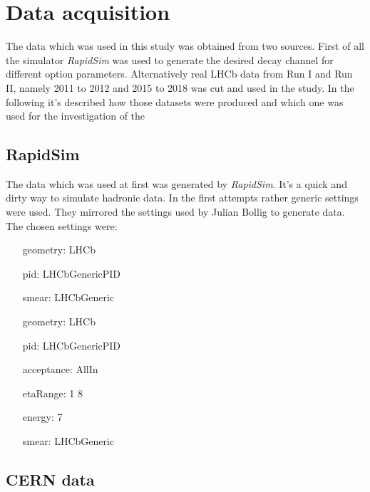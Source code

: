 \section{Data acquisition}
\noindent
The data which was used in this study was obtained from two sources. First of all the simulator \textit{RapidSim} was used to generate the desired decay channel for different option parameters. Alternatively real LHCb data from Run I and Run II, namely 2011 to 2012 and 2015 to 2018 was cut and used in the study. In the following it's described how those datasets were produced and which one was used for the investigation of the  

\subsection{RapidSim}
\noindent
The data which was used at first was generated by \textit{RapidSim}. It's a quick and dirty way to simulate hadronic data. In the first attempts rather generic settings were used. They mirrored the settings used by Julian Bollig to generate data. The chosen settings were: 

\begin{enumerate}
	\item[geometry: LHCb]
	\item[pid: LHCbGenericPID]
	\item[smear: LHCbGeneric]
\end{enumerate}

\begin{enumerate}
	\item[geometry: LHCb]
	\item[pid: LHCbGenericPID]
	\item[acceptance: AllIn]
	\item[etaRange: 1 8]
	\item[energy: 7]
	\item[smear: LHCbGeneric]
\end{enumerate}

\subsection{CERN data}